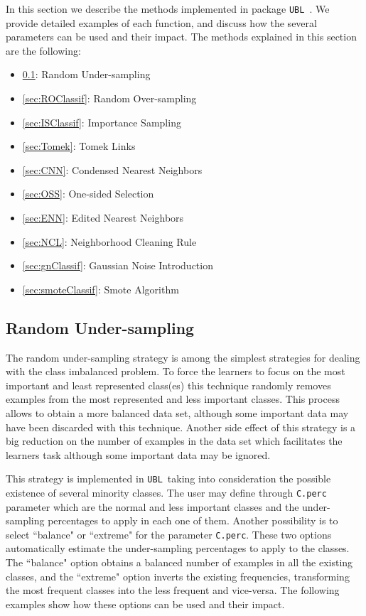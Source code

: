 \documentclass[10pt,a4paper]{article}\usepackage[]{graphicx}\usepackage[]{color}
\newcommand{\UBL}{\texttt{UBL}\ }
\newcommand{\pUBL}{package \texttt{UBL}\ }
\begin{document}
In this section we describe the methods implemented in \pUBL. We provide detailed examples of each function, and discuss how the several parameters can be used and their impact.
The methods explained in this section are the following:
\begin{itemize}
\item \ref{sec:RUClassif}: Random Under-sampling
\item \ref{sec:ROClassif}: Random Over-sampling
\item \ref{sec:ISClassif}: Importance Sampling
\item \ref{sec:Tomek}: Tomek Links
\item \ref{sec:CNN}: Condensed Nearest Neighbors
\item \ref{sec:OSS}: One-sided Selection
\item \ref{sec:ENN}: Edited Nearest Neighbors
\item \ref{sec:NCL}: Neighborhood Cleaning Rule
\item \ref{sec:gnClassif}: Gaussian Noise Introduction
\item \ref{sec:smoteClassif}: Smote Algorithm
\end{itemize}

\subsection{Random Under-sampling}\label{sec:RUClassif}

The random under-sampling strategy is among the simplest strategies for dealing with the class imbalanced problem. To force the learners to focus on the most important and least represented class(es) this technique randomly removes examples from the most represented and less important classes. This process allows to obtain a more balanced data set, although some important data may have been discarded with this technique. Another side effect of this strategy is a big reduction on the number of examples in the data set which facilitates the learners task although some important data may be ignored.

This strategy is implemented in \UBL taking into consideration the possible existence of several minority classes. The user may define through \texttt{C.perc} parameter which are the normal and less important classes and the under-sampling percentages to apply in each one of them. Another possibility is to select ``balance" or ``extreme" for the parameter \texttt{C.perc}. These two options automatically estimate the under-sampling percentages to apply to the classes. The ``balance" option obtains a balanced number of examples in all the existing classes, and the ``extreme" option inverts the existing frequencies, transforming the most frequent classes into the less frequent and vice-versa. The following examples show how these options can be used and their impact.
\end{document}
